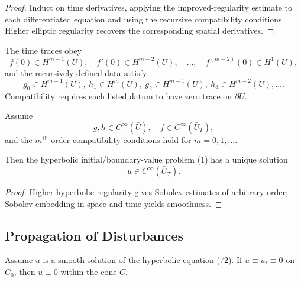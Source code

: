 \begin{proof}
\sketch Induct on time derivatives, applying the improved-regularity estimate to each differentiated equation and using the recursive compatibility conditions. Higher elliptic regularity recovers the corresponding spatial derivatives.
\end{proof}

\begin{remark}
\label{rem:hyperbolic-higher-regularity-remark}
The time traces obey
\[
f(0)\in H^{m-1}(U),\quad f'(0)\in H^{m-2}(U),\quad\ldots,\quad f^{(m-2)}(0)\in H^1(U),
\tag{65}
\]
and the recursively defined data satisfy
\[
g_0\in H^{m+1}(U),\ h_1\in H^m(U),\ g_2\in H^{m-1}(U),\ h_3\in H^{m-2}(U),\ldots.
\tag{66}
\]
Compatibility requires each listed datum to have zero trace on $\partial U$.
\end{remark}

\begin{theorem}
\label{thm:hyperbolic-infinite-differentiability}
Assume
\[
g, h \in C^\infty(\bar{U}), \quad f \in C^\infty(\bar{U}_T),
\]
and the $m^{\text{th}}$-order compatibility conditions hold for $m = 0, 1, \ldots$.

Then the hyperbolic initial/boundary-value problem (1) has a unique solution
\[
u \in C^\infty(\bar{U}_T).
\]
\end{theorem}

\begin{proof}
\sketch Higher hyperbolic regularity gives Sobolev estimates of arbitrary order; Sobolev embedding in space and time yields smoothness.
\end{proof}

\subsection{Propagation of Disturbances}

\begin{theorem}
\label{thm:hyperbolic-finite-propagation-speed}
Assume $u$ is a smooth solution of the hyperbolic equation (72). If $u \equiv u_t \equiv 0$ on $C_0$, then $u \equiv 0$ within the cone $C$.
\end{theorem}

